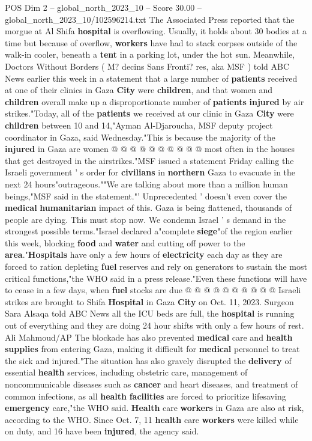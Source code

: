 \begin{textsample}{POS Dim 2 – global\_north\_2023\_10 – Score 30.00 – global\_north\_2023\_10/102596214.txt}
The Associated Press reported that the morgue at Al Shifa \textbf{hospital} is overflowing.
Usually, it holds about 30 bodies at a time but because of overflow, \textbf{workers} have had to stack corpses outside of the walk-in cooler, beneath a \textbf{tent} in a parking lot, under the hot sun.
Meanwhile, Doctors Without Borders ( M? decins Sans Fronti? res, aka MSF ) told ABC News earlier this week in a statement that a large number of \textbf{patients} received at one of their clinics in Gaza \textbf{City} were \textbf{children}, and that women and \textbf{children} overall make up a disproportionate number of \textbf{patients} \textbf{injured} by air strikes."Today, all of the \textbf{patients} we received at our clinic in Gaza \textbf{City} were \textbf{children} between 10 and 14,"Ayman Al-Djaroucha, MSF deputy project coordinator in Gaza, said Wednesday."This is because the majority of the \textbf{injured} in Gaza are women @ @ @ @ @ @ @ @ @ @ most often in the houses that get destroyed in the airstrikes."MSF issued a statement Friday calling the Israeli government ' s order for \textbf{civilians} in \textbf{northern} Gaza to evacuate in the next 24 hours"outrageous.""We are talking about more than a million human beings,"MSF said in the statement."' Unprecedented ' doesn't even cover the \textbf{medical} \textbf{humanitarian} impact of this.
Gaza is being flattened, thousands of people are dying.
This must stop now.
We condemn Israel ' s demand in the strongest possible terms."Israel declared a"complete \textbf{siege}"of the region earlier this week, blocking \textbf{food} and \textbf{water} and cutting off power to the \textbf{area}."\textbf{Hospitals} have only a few hours of \textbf{electricity} each day as they are forced to ration depleting \textbf{fuel} reserves and rely on generators to sustain the most critical functions,"the WHO said in a press release."Even these functions will have to cease in a few days, when \textbf{fuel} stocks are due @ @ @ @ @ @ @ @ @ @ Israeli strikes are brought to Shifa \textbf{Hospital} in Gaza \textbf{City} on Oct. 11, 2023.
Surgeon Sara Alsaqa told ABC News all the ICU beds are full, the \textbf{hospital} is running out of everything and they are doing 24 hour shifts with only a few hours of rest.
Ali Mahmoud/AP The blockade has also prevented \textbf{medical} care and \textbf{health} \textbf{supplies} from entering Gaza, making it difficult for \textbf{medical} personnel to treat the sick and injured."The situation has also gravely disrupted the \textbf{delivery} of essential \textbf{health} services, including obstetric care, management of noncommunicable diseases such as \textbf{cancer} and heart diseases, and treatment of common infections, as all \textbf{health} \textbf{facilities} are forced to prioritize lifesaving \textbf{emergency} care,"the WHO said. \textbf{Health} care \textbf{workers} in Gaza are also at risk, according to the WHO.
Since Oct. 7, 11 \textbf{health} care \textbf{workers} were killed while on duty, and 16 have been \textbf{injured}, the agency said.


\end{textsample}
